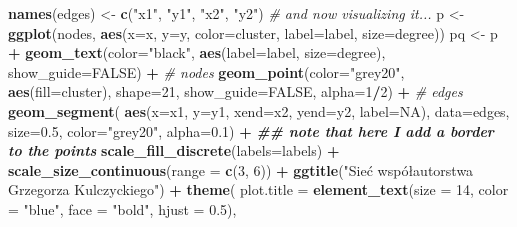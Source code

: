 \documentclass[
  12pt,
]{article}
\newenvironment{Shaded}{\begin{snugshade}}{\end{snugshade}}
\newcommand{\AttributeTok}[1]{\textcolor[rgb]{0.13,0.29,0.53}{#1}}
\newcommand{\CommentTok}[1]{\textcolor[rgb]{0.56,0.35,0.01}{\textit{#1}}}
\newcommand{\ConstantTok}[1]{\textcolor[rgb]{0.56,0.35,0.01}{#1}}
\newcommand{\DecValTok}[1]{\textcolor[rgb]{0.00,0.00,0.81}{#1}}
\newcommand{\DocumentationTok}[1]{\textcolor[rgb]{0.56,0.35,0.01}{\textbf{\textit{#1}}}}
\newcommand{\FloatTok}[1]{\textcolor[rgb]{0.00,0.00,0.81}{#1}}
\newcommand{\FunctionTok}[1]{\textcolor[rgb]{0.13,0.29,0.53}{\textbf{#1}}}
\newcommand{\NormalTok}[1]{#1}
\newcommand{\OtherTok}[1]{\textcolor[rgb]{0.56,0.35,0.01}{#1}}
\newcommand{\SpecialCharTok}[1]{\textcolor[rgb]{0.81,0.36,0.00}{\textbf{#1}}}
\newcommand{\StringTok}[1]{\textcolor[rgb]{0.31,0.60,0.02}{#1}}
\begin{document}
\begin{Shaded}
\begin{Highlighting}[]
\FunctionTok{names}\NormalTok{(edges) }\OtherTok{\textless{}{-}} \FunctionTok{c}\NormalTok{(}\StringTok{"x1"}\NormalTok{, }\StringTok{"y1"}\NormalTok{, }\StringTok{"x2"}\NormalTok{, }\StringTok{"y2"}\NormalTok{)}
\CommentTok{\# and now visualizing it...}
\NormalTok{p }\OtherTok{\textless{}{-}} \FunctionTok{ggplot}\NormalTok{(nodes, }\FunctionTok{aes}\NormalTok{(}\AttributeTok{x=}\NormalTok{x, }\AttributeTok{y=}\NormalTok{y, }\AttributeTok{color=}\NormalTok{cluster, }\AttributeTok{label=}\NormalTok{label, }\AttributeTok{size=}\NormalTok{degree))}
\NormalTok{pq }\OtherTok{\textless{}{-}}\NormalTok{ p }\SpecialCharTok{+} \FunctionTok{geom\_text}\NormalTok{(}\AttributeTok{color=}\StringTok{"black"}\NormalTok{, }\FunctionTok{aes}\NormalTok{(}\AttributeTok{label=}\NormalTok{label, }\AttributeTok{size=}\NormalTok{degree),}
                    \AttributeTok{show\_guide=}\ConstantTok{FALSE}\NormalTok{) }\SpecialCharTok{+}
  \CommentTok{\# nodes}
  \FunctionTok{geom\_point}\NormalTok{(}\AttributeTok{color=}\StringTok{"grey20"}\NormalTok{, }\FunctionTok{aes}\NormalTok{(}\AttributeTok{fill=}\NormalTok{cluster),}
             \AttributeTok{shape=}\DecValTok{21}\NormalTok{, }\AttributeTok{show\_guide=}\ConstantTok{FALSE}\NormalTok{, }\AttributeTok{alpha=}\DecValTok{1}\SpecialCharTok{/}\DecValTok{2}\NormalTok{) }\SpecialCharTok{+}
  \CommentTok{\# edges}
  \FunctionTok{geom\_segment}\NormalTok{(}
    \FunctionTok{aes}\NormalTok{(}\AttributeTok{x=}\NormalTok{x1, }\AttributeTok{y=}\NormalTok{y1, }\AttributeTok{xend=}\NormalTok{x2, }\AttributeTok{yend=}\NormalTok{y2, }\AttributeTok{label=}\ConstantTok{NA}\NormalTok{),}
    \AttributeTok{data=}\NormalTok{edges, }\AttributeTok{size=}\FloatTok{0.5}\NormalTok{, }\AttributeTok{color=}\StringTok{"grey20"}\NormalTok{, }\AttributeTok{alpha=}\FloatTok{0.1}\NormalTok{) }\SpecialCharTok{+}
  \DocumentationTok{\#\# note that here I add a border to the points}
  \FunctionTok{scale\_fill\_discrete}\NormalTok{(}\AttributeTok{labels=}\NormalTok{labels) }\SpecialCharTok{+}
  \FunctionTok{scale\_size\_continuous}\NormalTok{(}\AttributeTok{range =} \FunctionTok{c}\NormalTok{(}\DecValTok{3}\NormalTok{, }\DecValTok{6}\NormalTok{)) }\SpecialCharTok{+}
  \FunctionTok{ggtitle}\NormalTok{(}\StringTok{"Sieć współautorstwa Grzegorza Kulczyckiego"}\NormalTok{) }\SpecialCharTok{+}
  \FunctionTok{theme}\NormalTok{(}
    \AttributeTok{plot.title =} \FunctionTok{element\_text}\NormalTok{(}\AttributeTok{size =} \DecValTok{14}\NormalTok{, }\AttributeTok{color =} \StringTok{"blue"}\NormalTok{, }\AttributeTok{face =} \StringTok{"bold"}\NormalTok{, }\AttributeTok{hjust =} \FloatTok{0.5}\NormalTok{),}

\end{Highlighting}
\end{Shaded}
\end{document}
